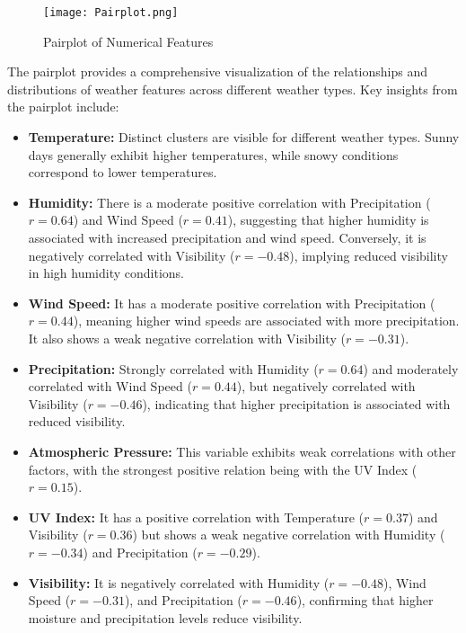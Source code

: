 \documentclass{article}
\begin{document}
\begin{figure}[H]
    \centering
    \texttt{[image: Pairplot.png]}
    \caption{Pairplot of Numerical Features}
\end{figure}


The pairplot provides a comprehensive visualization of the relationships and distributions of weather features across different weather types. Key insights from the pairplot include:

\begin{itemize}
\item \textbf{Temperature:} Distinct clusters are visible for different weather types. Sunny days generally exhibit higher temperatures, while snowy conditions correspond to lower temperatures.
\item \textbf{Humidity:} There is a moderate positive correlation with Precipitation ($r = 0.64$) and Wind Speed ($r = 0.41$), suggesting that higher humidity is associated with increased precipitation and wind speed. Conversely, it is negatively correlated with Visibility ($r = -0.48$), implying reduced visibility in high humidity conditions.

\item \textbf{Wind Speed:} It has a moderate positive correlation with Precipitation ($r = 0.44$), meaning higher wind speeds are associated with more precipitation. It also shows a weak negative correlation with Visibility ($r = -0.31$).

\item \textbf{Precipitation:} Strongly correlated with Humidity ($r = 0.64$) and moderately correlated with Wind Speed ($r = 0.44$), but negatively correlated with Visibility ($r = -0.46$), indicating that higher precipitation is associated with reduced visibility.

\item \textbf{Atmospheric Pressure:} This variable exhibits weak correlations with other factors, with the strongest positive relation being with the UV Index ($r = 0.15$).

\item \textbf{UV Index:} It has a positive correlation with Temperature ($r = 0.37$) and Visibility ($r = 0.36$) but shows a weak negative correlation with Humidity ($r = -0.34$) and Precipitation ($r = -0.29$).

\item \textbf{Visibility:} It is negatively correlated with Humidity ($r = -0.48$), Wind Speed ($r = -0.31$), and Precipitation ($r = -0.46$), confirming that higher moisture and precipitation levels reduce visibility.
\end{itemize}
\end{document}

